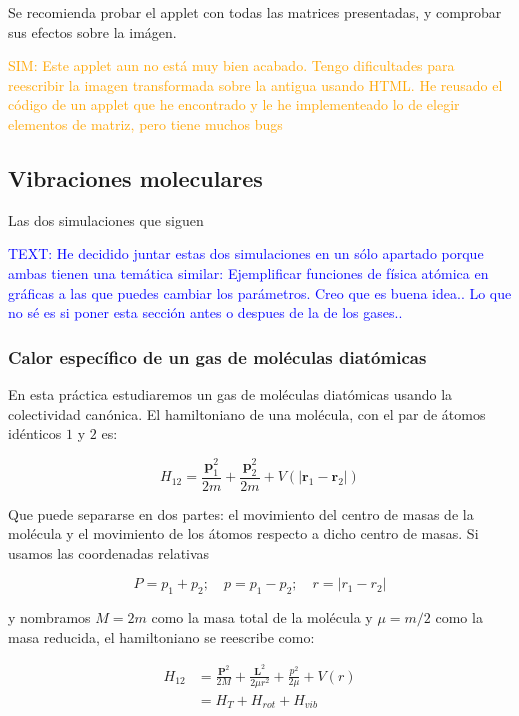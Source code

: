\documentclass[11pt, a4paper]{article} %
\theoremstyle{named}
\begin{document}
            Se recomienda probar el applet con todas las matrices presentadas, y comprobar sus efectos sobre la imágen.

            \textcolor{orange}{SIM: Este applet aun no está muy bien acabado. Tengo dificultades para reescribir la imagen transformada sobre la antigua usando HTML. He reusado el código de un applet que he encontrado y le he implementeado lo de elegir elementos de matriz, pero tiene muchos bugs}

    \newpage
    \subsection{Vibraciones moleculares}

        Las dos simulaciones que siguen

        \textcolor{blue}{TEXT: He decidido juntar estas dos simulaciones en un sólo apartado porque ambas tienen una temática similar: Ejemplificar funciones de física atómica en gráficas a las que puedes cambiar los parámetros. Creo que es buena idea.. Lo que no sé es si poner esta sección antes o despues de la de los gases..}

        \subsubsection{Calor específico de un gas de moléculas diatómicas}\label{sec:diatomicas}

            En esta práctica estudiaremos un gas de moléculas diatómicas usando la colectividad canónica. El hamiltoniano de una molécula, con el par de átomos idénticos $1$ y $2$ es:

            $$
            H_{12}=\frac{\mathbf{p}_{1}^{2}}{2 m}+\frac{\mathbf{p}_{2}^{2}}{2 m}+V\left(\left|\mathbf{r}_{1}-\mathbf{r}_{2}\right|\right)
            $$

            Que puede separarse en dos partes: el movimiento del centro de masas de la molécula y el movimiento de los átomos respecto a dicho centro de masas. Si usamos las coordenadas relativas

            $$
            P = p_1 + p_2; \quad p = p_1 - p_2; \quad r = |r_1 - r_2|
            $$

            y nombramos $M = 2m$ como la masa total de la molécula y $\mu = m/2$ como la masa reducida, el hamiltoniano se reescribe como:

            \begin{equation}\label{eq:diatHtot}
                \begin{aligned}
                    H_{12}&=\frac{\mathbf{P}^{2}}{2 M}+\frac{\mathbf{L}^{2}}{2 \mu r^{2}}+{\frac{p^{2}}{2 \mu}+V(r)} \nonumber \\
                    &=H_{T}+H_{rot}+H_{vib}
                \end{aligned}
            \end{equation}
\end{document}
